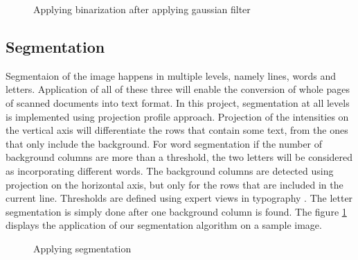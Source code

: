 \documentclass[9pt,twocolumn,twoside]{../../styles/osajnl}
\begin{document}
\begin{figure}[H]
\centering
{}
\caption{Applying binarization after applying gaussian filter}
\end{figure}

\subsection{ Segmentation}
Segmentaion of the image happens in multiple levels, namely lines, words 
and letters. Application of all of these three will enable the conversion
of whole pages of scanned documents into text format.
In this project, segmentation at all levels is implemented using 
projection profile approach. Projection of the intensities on the vertical
axis will differentiate the rows that contain some text, from the ones that
only include the background.
\newline
For word segmentation if the number of background columns are more than a 
threshold, the two letters will be considered as incorporating different words.
The background columns are detected using projection on the horizontal axis, but only
for the rows that are included in the current line. Thresholds are defined using
expert views in typography \cite{dowding1995finer}.
\newline
The letter segmentation is simply done after one background column is found.
The figure \ref{fig:segment} displays the application of our segmentation algorithm
on a sample image.

\begin{figure}[H]
\centering
{}
\caption{Applying segmentation}
\label{fig:segment}
\end{figure}
\end{document}
